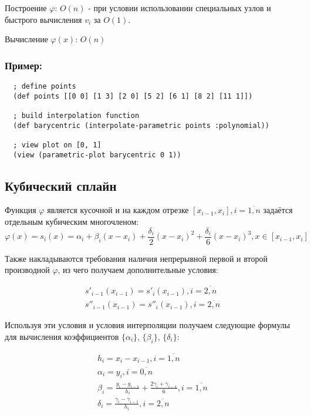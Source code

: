 Построение $\varphi$: $O(n)$ - при условии использовании специальных узлов и быстрого вычисления $v_i$ за $O(1)$.

Вычисление $\varphi(x)$: $O(n)$

\subsubsection{Пример:}

\begin{verbatim}
  ; define points
  (def points [[0 0] [1 3] [2 0] [5 2] [6 1] [8 2] [11 1]])

  ; build interpolation function
  (def barycentric (interpolate-parametric points :polynomial))

  ; view plot on [0, 1]
  (view (parametric-plot barycentric 0 1))
\end{verbatim}




\subsection{Кубический сплайн}

Функция $\varphi$ является кусочной и на каждом отрезке $[x_{i-1},x_i], i=\overline{1,n}$ задаётся отдельным кубическим многочленом:
\begin{equation}
  \varphi(x) = s_i(x) = \alpha_i + \beta_i(x - x_i) + \frac{\delta_i}{2}(x - x_i)^2 + \frac{\delta_i}{6}(x - x_i)^3, x \in [x_{i-1}, x_i]
\end{equation}

Также накладываются требования наличия непрерывной первой и второй производной $\varphi$, из чего получаем дополнительные условия:

\begin{equation}
  \begin{gathered}
    s'_{i-1}(x_{i-1}) = s'_i(x_{i-1}), i = \overline{2, n} \\
    s''_{i-1}(x_{i-1}) = s''_i(x_{i-1}), i = \overline{2, n}
  \end{gathered}
\end{equation}

Используя эти условия и условия интерполяции получаем следующие формулы для вычисления коэффициентов $\{\alpha_i\}$, $\{\beta_i\}$, $\{\delta_i\}$:

\begin{equation}
  \begin{gathered}
    h_i = x_i - x_{i-1}, i = \overline{1, n} \\
    \alpha_i = y_i, i = \overline{0, n} \\
    \beta_i = \frac{y_i - y_{i-1}}{h_i} + \frac{2\gamma_i + \gamma_{i - 1}}{6}, i = \overline{1, n} \\
    \delta_i = \frac{\gamma_i - \gamma_{i-1}}{h_i}, i = \overline{2, n}
  \end{gathered}
\end{equation}

